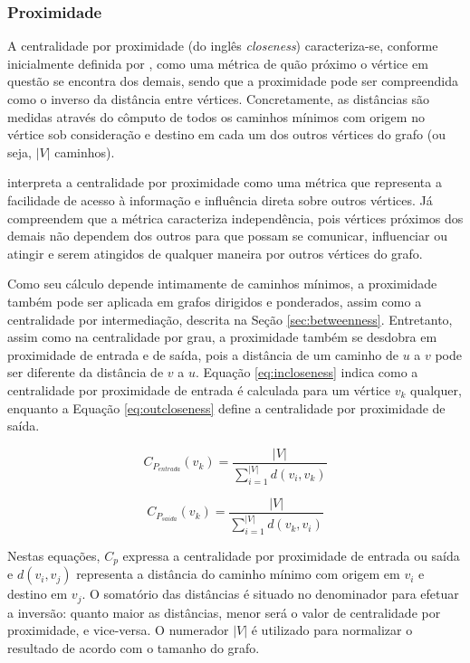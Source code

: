 \subsubsection{Proximidade} \label{sec:closeness}

A centralidade por proximidade (do inglês \textit{closeness}) caracteriza-se, conforme inicialmente definida por , como uma métrica de quão próximo o vértice em questão se encontra dos demais, sendo que a proximidade pode ser compreendida como o inverso da distância entre vértices. Concretamente, as distâncias são medidas através do cômputo de todos os caminhos mínimos com origem no vértice sob consideração e destino em cada um dos outros vértices do grafo (ou seja, $|V|$ caminhos).

 interpreta a centralidade por proximidade como uma métrica que representa a facilidade de acesso à informação e influência direta sobre outros vértices. Já  compreendem que a métrica caracteriza independência, pois vértices próximos dos demais não dependem dos outros para que possam se comunicar, influenciar ou atingir e serem atingidos de qualquer maneira por outros vértices do grafo.

Como seu cálculo depende intimamente de caminhos mínimos, a proximidade também pode ser aplicada em grafos dirigidos e ponderados, assim como a centralidade por intermediação, descrita na Seção \ref{sec:betweenness}. Entretanto, assim como na centralidade por grau, a proximidade também se desdobra em proximidade de entrada e de saída, pois a distância de um caminho de $u$ a $v$ pode ser diferente da distância de $v$ a $u$. Equação \ref{eq:incloseness} indica como a centralidade por proximidade de entrada é calculada para um vértice $v_k$ qualquer, enquanto a Equação \ref{eq:outcloseness} define a centralidade por proximidade de saída.

\begin{equation}
    \label{eq:incloseness}
    C_{P_{entrada}}(v_k) = \frac{|V|}{\sum_{i=1}^{|V|} d(v_i, v_k)}
\end{equation}

\begin{equation}
    \label{eq:outcloseness}
    C_{P_{saida}}(v_k) = \frac{|V|}{\sum_{i=1}^{|V|} d(v_k, v_i)}
\end{equation}

Nestas equações, $C_p$ expressa a centralidade por proximidade de entrada ou saída e $d(v_i, v_j)$ representa a distância do caminho mínimo com origem em $v_i$ e destino em $v_j$. O somatório das distâncias é situado no denominador para efetuar a inversão: quanto maior as distâncias, menor será o valor de centralidade por proximidade, e vice-versa. O numerador $|V|$ é utilizado para normalizar o resultado de acordo com o tamanho do grafo.

